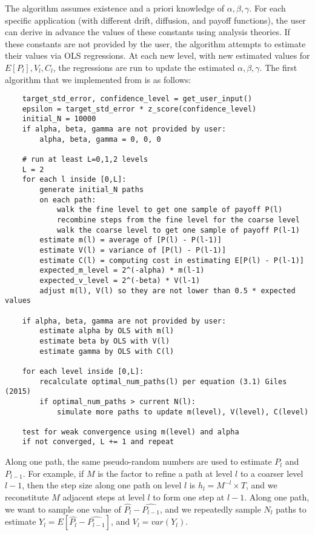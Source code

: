 \documentclass{article}
\begin{document}
	The algorithm assumes existence and a priori knowledge of $\alpha, \beta, \gamma$. For each specific application (with different drift, diffusion, and payoff functions), the user can derive in advance the values of these constants using analysis theories. If these constants are not provided by the user, the algorithm attempts to estimate their values via OLS regressions. At each new level, with new estimated values for $E[P_l], V_l, C_l$, the regressions are run to update the estimated $\alpha, \beta, \gamma$. The first algorithm that we implemented from \cite{giles15} is as follows:
    
	\begin{lstlisting}
	target_std_error, confidence_level = get_user_input()
    epsilon = target_std_error * z_score(confidence_level)
	initial_N = 10000
    if alpha, beta, gamma are not provided by user:
        alpha, beta, gamma = 0, 0, 0
	
    # run at least L=0,1,2 levels 
    L = 2
    for each l inside [0,L]:
        generate initial_N paths
        on each path:
            walk the fine level to get one sample of payoff P(l)
            recombine steps from the fine level for the coarse level
            walk the coarse level to get one sample of payoff P(l-1)
        estimate m(l) = average of [P(l) - P(l-1)]
        estimate V(l) = variance of [P(l) - P(l-1)]
        estimate C(l) = computing cost in estimating E[P(l) - P(l-1)]
        expected_m_level = 2^(-alpha) * m(l-1)
        expected_v_level = 2^(-beta) * V(l-1)
        adjust m(l), V(l) so they are not lower than 0.5 * expected values
    
    if alpha, beta, gamma are not provided by user:
        estimate alpha by OLS with m(l)
        estimate beta by OLS with V(l)
        estimate gamma by OLS with C(l)
    
    for each level inside [0,L]:
        recalculate optimal_num_paths(l) per equation (3.1) Giles (2015)    
        if optimal_num_paths > current N(l):
            simulate more paths to update m(level), V(level), C(level)
    
    test for weak convergence using m(level) and alpha
    if not converged, L += 1 and repeat    
    \end{lstlisting}   
        
    Along one path, the same pseudo-random numbers are used to estimate $P_l$ and $P_{l-1}$. For example, if $M$ is the factor to refine a path at level $l$ to a coarser level $l-1$, then the step size along one path on level $l$ is $h_l  = M^{-l} \times T$, and we reconstitute $M$ adjacent steps at level $l$ to form one step at $l-1$. Along one path, we want to sample one value of $\widehat{P_l} - \widehat{P_{l-1}}$, and we repeatedly sample $N_l$ paths to estimate $Y_l = E[\widehat{P_l} - \widehat{P_{l-1}}]$, and $V_l = var(Y_l)$.
    
\end{document}
